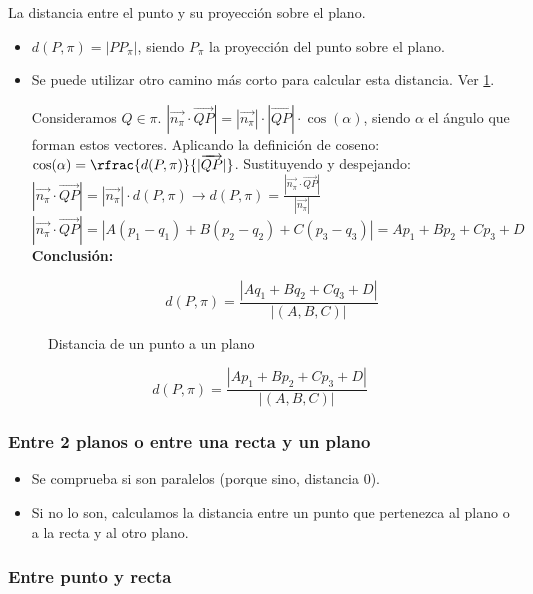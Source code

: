 La distancia entre el punto y su proyección sobre el plano. 

\begin{itemize}
  \item $d(P,\pi) = |PP_{\pi}|$, siendo $P_{\pi}$ la proyección del punto sobre el plano.
  \item Se puede utilizar otro camino más corto para calcular esta distancia. Ver \ref{fig::dist-punto-plano}.

  \subitem Consideramos $Q\in\pi$.
  \subitem $|\vec{n_{\pi}}·\vec{QP}| = |\vec{n_{\pi}}|·|\vec{QP}|·\cos(\alpha)$, siendo $\alpha$ el ángulo que forman estos vectores.
  \subitem Aplicando la definición de coseno: $\cos(\alpha) = \rfrac{d(P,\pi)}{|\vec{QP}|}$.
  \subitem Sustituyendo y despejando: $|\vec{n_{\pi}}·\vec{QP}| = |\vec{n_{\pi}}|·d(P,\pi) \to d(P,\pi) = \frac{|\vec{n_{\pi}}·\vec{QP}|}{|\vec{n_{\pi}}|}$
  \subitem $|\vec{n_{\pi}}·\vec{QP}| = |A(p_1-q_1) + B(p_2-q_2) + C(p_3-q_3)| = Ap_1+Bp_2+Cp_3+D$
  \subitem \textbf{Conclusión:}

  \[
    d(P,\pi) = \frac{|Aq_1+Bq_2+Cq_3+D|}{|(A,B,C)|}
  \]
\end{itemize}

\begin{figure}[hbtp]
\centering
{}

\label{fig::dist-punto-plano}
\caption{Distancia de un punto a un plano}
\end{figure}

\[d(P,\pi) = \frac{|Ap_1+Bp_2+Cp_3+D|}{|(A,B,C)|}\]

\subsubsection{Entre 2 planos o entre una recta y un plano}

\begin{itemize}
  \item Se comprueba si son paralelos (porque sino, distancia 0).
  \item Si no lo son, calculamos la distancia entre un punto que pertenezca al plano o a la recta y al otro plano.
\end{itemize}

\subsubsection{Entre punto y recta}


